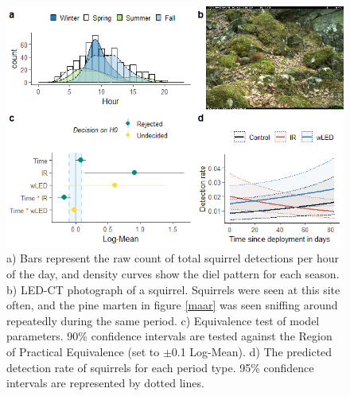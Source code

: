 \begin{figure}
	\centering
	\includegraphics[width=13cm]{../R/glmm_sp_files/figure-html/ekorn2-1.png}
	\caption[Red squirrel]
	{\footnotesize
		a) Bars represent the raw count of total squirrel detections per hour of the day, and density curves show the diel pattern for each season.
		b) LED-CT photograph of a squirrel. Squirrels were seen at this site often, and the pine marten in figure \ref{maar} was seen sniffing around repeatedly during the same period.
		c) Equivalence test of model parameters. 90\% confidence intervals are tested against the Region of Practical Equivalence (set to $\pm$0.1 Log-Mean).
		d) The predicted detection rate of squirrels for each period type. 95\% confidence intervals are represented by dotted lines.}
	\label{ekorn}
\end{figure}








